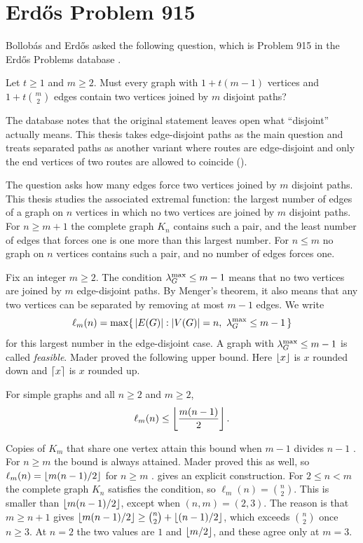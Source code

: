 \section{Erd\H{o}s Problem 915}\label{sec:erdos915}

Bollob\'{a}s and Erd\H{o}s \cite{BollobasErdos62} asked the following question, which is Problem 915 in the Erd\H{o}s Problems database \cite{ErdosProblems}.

\begin{ques}
Let $t\ge1$ and $m\ge2$. Must every graph with $1+t(m-1)$ vertices and $1+t\binom m2$ edges contain two vertices joined by $m$ disjoint paths?
\end{ques}

The database notes that the original statement leaves open what ``disjoint'' actually means.
This thesis takes edge-disjoint paths as the main question and treats separated paths as another variant where routes are edge-disjoint and only the end vertices of two routes are allowed to coincide ().

The question asks how many edges force two vertices joined by $m$ disjoint paths.
This thesis studies the associated extremal function: the largest number of edges of a graph on $n$ vertices in which no two vertices are joined by $m$ disjoint paths.
For $n\ge m+1$ the complete graph $K_n$ contains such a pair, and the least number of edges that forces one is one more than this largest number.
For $n\le m$ no graph on $n$ vertices contains such a pair, and no number of edges forces one.

Fix an integer $m\ge2$.
The condition $\lambda_G^{\max}\le m-1$ means that no two vertices are joined by $m$ edge-disjoint paths.
By Menger's theorem, it also means that any two vertices can be separated by removing at most $m-1$ edges.
We write
\[
    \ell_m(n) = \max\{\, |E(G)| : |V(G)| = n,\ \lambda_G^{\max} \le m - 1 \,\}
\]
for this largest number in the edge-disjoint case.
A graph with $\lambda_G^{\max}\le m-1$ is called \emph{feasible}.
Mader proved the following upper bound. Here $\left\lfloor x \right\rfloor$ is $x$ rounded down and $\left\lceil x \right\rceil$ is $x$ rounded up.

\begin{theorem}\label{thm:mader}
For simple graphs and all $n \ge 2$ and $m \ge 2$,
\[
    \ell_m(n) \le \left\lfloor \frac{m(n-1)}{2} \right\rfloor.
\]
\end{theorem}

Copies of $K_m$ that share one vertex attain this bound when $m-1$ divides $n-1$ \cite{ErdosProblems}.
For $n\ge m$ the bound is always attained. Mader proved this as well, so $\ell_m(n)=\left\lfloor m(n-1)/2 \right\rfloor$ for $n\ge m$ \cite{Mader73}.  gives an explicit construction.
For $2\le n<m$ the complete graph $K_n$ satisfies the condition, so $\ell_m(n)=\binom{n}{2}$.
This is smaller than $\left\lfloor m(n-1)/2 \right\rfloor$, except when $(n,m)=(2,3)$. The reason is that $m\ge n+1$ gives $\left\lfloor m(n-1)/2 \right\rfloor\ge\binom{n}{2}+\left\lfloor (n-1)/2 \right\rfloor$, which exceeds $\binom{n}{2}$ once $n\ge3$. At $n=2$ the two values are $1$ and $\left\lfloor m/2 \right\rfloor$, and these agree only at $m=3$.

